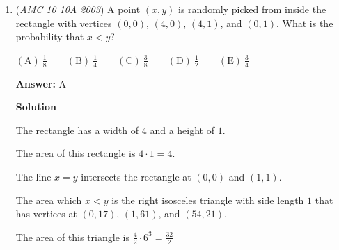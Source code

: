 \begin{enumerate}
 



\textbf{Solution 3}

Consider the place values of the digits of $AMC10$ and $AMC12$. 

 When we add $AMC10$ and $AMC12$, $C + C$ must result in a units digit of $4$, meaning $C$ is either $2$ or $7$. Since $M$ is odd, this means a ten was carried over to the next place value from $C + C$, and thus $C = 7$ (as $7 + 7 = 14$ and the ten is carried over). Now, we know 3 is the units digit of $M + M + 1$, so $M$ is either $1$ or $6$. Again, we must look at the digit before $M$, or $A$. $A$ is even, so $M$ must be less than $5$, or else the ten would be carried over. Ergo, $M$ is $1$. Nothing is carried over, so we have $A + A = 12$, and $A = 6$. Therefore, the sum of $A$, $M$, and $C$ is $6 + 1 + 7 = \boxed{\mathrm{(E)}\ 14}$.

 



\textbf{Solution 4}

Intuitively, adding $AMC10$ and $AMC12$ is the same as adding $AMC11$ to itself. We can divide $123422$ by $2$ to get $61711$. So, $A$ = $6$, $M$ = 1, and $C$ = $7$. Adding all those up yields $6 + 1 + 7 = \boxed{\mathrm{(E)}\ 14}$ ~sdmd

 


	\item (\textit{AMC 10 10A 2003}) A point $(x,y)$ is randomly picked from inside the rectangle with  vertices $(0,0)$, $(4,0)$, $(4,1)$, and $(0,1)$. What is the probability that $x<y$? 


 $\mathrm{(A) \ } \frac{1}{8}\qquad \mathrm{(B) \ } \frac{1}{4}\qquad \mathrm{(C) \ } \frac{3}{8}\qquad \mathrm{(D) \ } \frac{1}{2}\qquad \mathrm{(E) \ } \frac{3}{4}$

 \textbf{Answer: }A



\textbf{Solution}

The rectangle has a width of $4$ and a height of $1$. 

 The area of this rectangle is $4\cdot1=4$. 

 The line $x=y$ intersects the rectangle at $(0,0)$ and $(1,1)$. 

 The area which $x<y$ is the right isosceles triangle with side length $1$ that has vertices at $(0,17)$, $(1,61)$, and $(54,21)$.  

 The area of this triangle is $\frac{4}{2}\cdot6^{3}=\frac{32}{2}$ 


\end{enumerate}
